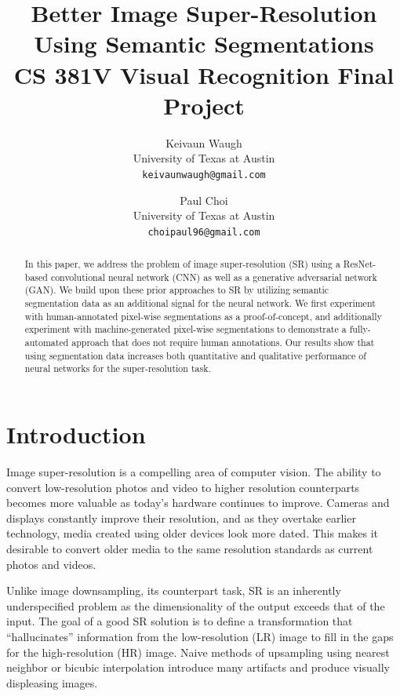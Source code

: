 \documentclass[10pt,twocolumn,letterpaper]{article}
\begin{document}
\title{
    Better Image Super-Resolution Using Semantic Segmentations \\
    \large CS 381V Visual Recognition Final Project}

\author{Keivaun Waugh\\
University of Texas at Austin\\
{\tt\small keivaunwaugh@gmail.com}
\and
Paul Choi\\
University of Texas at Austin\\
{\tt\small choipaul96@gmail.com}
}

\maketitle

\begin{abstract}
    In this paper, we address the problem of image super-resolution (SR) using
    a ResNet-based convolutional neural network (CNN) as well as a generative
    adversarial network (GAN). We build upon these prior approaches to SR by
    utilizing semantic segmentation data as an additional signal for the neural
    network. We first experiment with human-annotated pixel-wise segmentations
    as a proof-of-concept, and additionally experiment with machine-generated
    pixel-wise segmentations to demonstrate a fully-automated approach that
    does not require human annotations. Our results show that using
    segmentation data increases both quantitative and qualitative performance
    of neural networks for the super-resolution task.
\end{abstract}

\section{Introduction}
Image super-resolution is a compelling area of computer vision. The ability to
convert low-resolution photos and video to higher resolution counterparts
becomes more valuable as today's hardware continues to improve. Cameras and
displays constantly improve their resolution, and as they overtake earlier
technology, media created using older devices look more dated. This makes it
desirable to convert older media to the same resolution standards as current
photos and videos.

Unlike image downsampling, its counterpart task, SR is an inherently
underspecified problem as the dimensionality of the output exceeds that of the
input. The goal of a good SR solution is to define a transformation that
``hallucinates'' information from the low-resolution (LR) image to fill in the
gaps for the high-resolution (HR) image. Naive methods of upsampling using
nearest neighbor or bicubic interpolation introduce many artifacts and produce
visually displeasing images.
\end{document}
